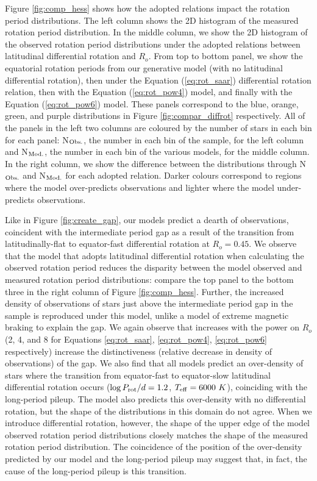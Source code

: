 Figure \ref{fig:comp_hess} shows how the adopted relations impact the rotation period distributions.
The left column shows the 2D histogram of the \citet{mcquillan_rotation_2014} measured rotation period distribution.
In the middle column, we show the 2D histogram of the observed rotation period distributions under the adopted relations between latitudinal differential rotation and $R_o$.
From top to bottom panel, we show the equatorial rotation periods from our generative model (with no latitudinal differential rotation), then under the \citet{saar_starspots_2011} Equation (\ref{eq:rot_saar}) differential rotation relation, then with the Equation (\ref{eq:rot_pow4}) model, and finally with the Equation (\ref{eq:rot_pow6}) model.
These panels correspond to the blue, orange, green, and purple distributions in Figure \ref{fig:compar_diffrot} respectively.
All of the panels in the left two columns are coloured by the number of stars in each bin for each panel: N$_{\rm{Obs.}}$, the number in each bin of the \citet{mcquillan_rotation_2014} sample, for the left column and N$_{\rm{Mod.}}$, the number in each bin of the various models, for the middle column.
In the right column, we show the difference between the distributions through N$_{\rm{Obs.}}$ and N$_{\rm{Mod.}}$ for each adopted relation.
Darker colours correspond to regions where the model over-predicts observations and lighter where the model under-predicts observations.

Like in Figure \ref{fig:create_gap}, our models predict a dearth of observations, coincident with the intermediate period gap as a result of the transition from latitudinally-flat to equator-fast differential rotation at $R_o = 0.45$.
We observe that the model that adopts latitudinal differential rotation when calculating the observed rotation period reduces the disparity between the model observed and measured rotation period distributions: compare the top panel to the bottom three in the right column of Figure \ref{fig:comp_hess}.
Further, the increased density of observations of stars just above the intermediate period gap in the \kepler{} sample is reproduced under this model, unlike a model of extreme magnetic braking to explain the gap.
We again observe that increases with the power on $R_o$ (2, 4, and 8 for Equations \ref{eq:rot_saar}, \ref{eq:rot_pow4}, \ref{eq:rot_pow6} respectively) increase the distinctiveness (relative decrease in density of observations) of the gap.
We also find that all models predict an over-density of stars where the transition from equator-fast to equator-slow latitudinal differential rotation occurs ($\log P_{\rm{rot}}/d = 1.2$, $T_{\rm{eff}} = 6000 \ K$), coinciding with the long-period pileup.
The model also predicts this over-density with no differential rotation, but the shape of the distributions in this domain do not agree.
When we introduce differential rotation, however, the shape of the upper edge of the model observed rotation period distributions closely matches the shape of the measured rotation period distribution.
The coincidence of the position of the over-density predicted by our model and the long-period pileup may suggest that, in fact, the cause of the long-period pileup is this transition.


